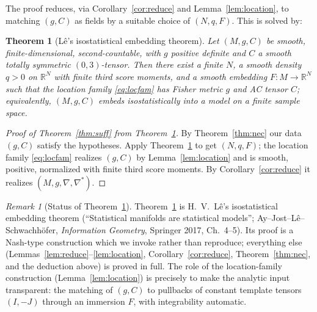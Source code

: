 \documentclass{amsart}
\newtheorem{theorem}{Theorem}
\theoremstyle{definition}
\theoremstyle{remark}
\newtheorem{remark}{Remark}
\begin{document}
The proof reduces, via Corollary~\ref{cor:reduce} and Lemma~\ref{lem:location},
to matching $(g,C)$ as fields by a suitable choice of $(N,q,F)$. This is solved by:

\begin{theorem}[L\^e's isostatistical embedding theorem]\label{thm:Le}
Let $(M,g,C)$ be smooth, finite-dimensional, second-countable, with $g$ positive
definite and $C$ a smooth totally symmetric $(0,3)$-tensor. Then there exist a
finite $N$, a smooth density $q>0$ on $\mathbb R^{N}$ with finite third score
moments, and a smooth embedding $F\colon M\to\mathbb R^{N}$ such that the
location family \eqref{eq:locfam} has Fisher metric $g$ and AC tensor $C$;
equivalently, $(M,g,C)$ embeds isostatistically into a model on a finite sample
space.
\end{theorem}

\begin{proof}[Proof of Theorem~\ref{thm:suff} from Theorem~\ref{thm:Le}]
By Theorem~\ref{thm:nec} our data $(g,C)$ satisfy the hypotheses. Apply
Theorem~\ref{thm:Le} to get $(N,q,F)$; the location family
\eqref{eq:locfam} realizes $(g,C)$ by Lemma~\ref{lem:location} and is smooth,
positive, normalized with finite third score moments. By
Corollary~\ref{cor:reduce} it realizes $(M,g,\nabla,\nabla^{*})$.
\end{proof}

\begin{remark}[Status of Theorem~\ref{thm:Le}]
Theorem~\ref{thm:Le} is H.~V.~L\^e's isostatistical embedding theorem
(``Statistical manifolds are statistical models''; Ay--Jost--L\^e--Schwachh\"ofer,
\emph{Information Geometry}, Springer 2017, Ch.~4--5). Its proof is a Nash-type
construction which we invoke rather than reproduce; everything else
(Lemmas~\ref{lem:reduce}--\ref{lem:location}, Corollary~\ref{cor:reduce},
Theorem~\ref{thm:nec}, and the deduction above) is proved in full. The role of
the location-family construction (Lemma~\ref{lem:location}) is precisely to make
the analytic input transparent: the matching of $(g,C)$ to pullbacks of constant
template tensors $(I,-J)$ through an immersion $F$, with integrability automatic.
\end{remark}
\end{document}
